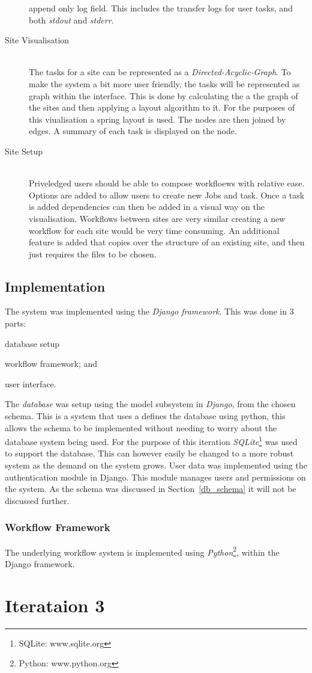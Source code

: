 \documentclass[12pt,a4paper]{report}
\begin{document}
\begin{description}
        append only log field. This includes the transfer logs for user tasks, and both
        \emph{stdout} and \emph{stderr}.
    \item[Site Visualisation] \hfill \\
        The tasks for a site can be represented as a \emph{Directed-Acyclic-Graph}. To
        make the system a bit more user friendly, the tasks will be represented as
        graph within the interface. This is done by calculating the a the graph of
        the sites and then applying a layout algorithm to it. For the purposes of this
        viualisation a spring layout is used. The nodes are then joined by edges. A
        summary of each task is displayed on the node.
    \item[Site Setup] \hfill \\
        Priveledged users should be able to compose workfloews with relative ease. Options
        are added to allow users to create new Jobs and task. Once a task is added dependencies
        can then be added in a visual way on the visualisation. Workflows between sites are very similar
        creating a new workflow for each site would be very time consuming. An additional
        feature is added that copies over the structure of an existing site, and then
        just requires the files to be chosen.
\end{description}
\subsection{Implementation}
The system was implemented using the \emph{Django framework}. This was done in 3 parts:
\begin{inparaenum}
\item database setup
\item workflow framework; and
\item user interface.
\end{inparaenum}

The \emph{database} was setup using the model subsystem in \emph{Django}, from the chosen schema.
This is a system that uses a defines the database using python, this allows the schema
to be implemented without needing to worry about the database system being used. For the
purpose of this iteration \emph{SQLite}\footnote{SQLite: www.sqlite.org} was used to
support the database. This can however easily be changed to a more robust system as the demand
on the system grows. User data was implemented using the authentication module in Django. This
module manages users and permissions on the system. As the schema was discussed in Section~\ref{db_schema}
it will not be discussed further.

\subsubsection{Workflow Framework}
The underlying workflow system is implemented using \emph{Python}\footnote{Python: www.python.org}, within
the Django framework.



\section{Iterataion 3\label{iteration3}}


{}

\end{document}
